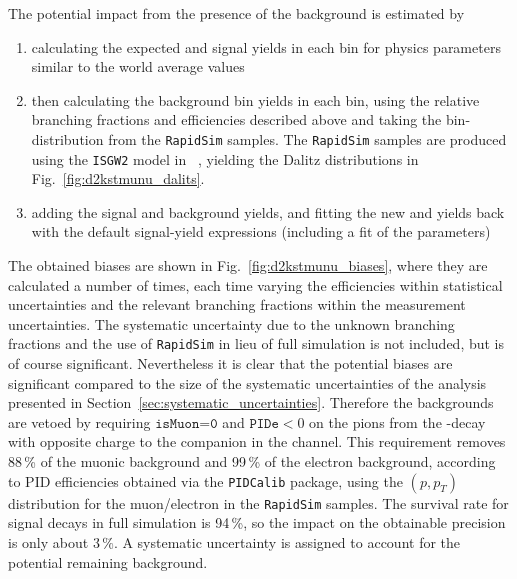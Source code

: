 


The potential impact from the presence of the background is estimated by 
\begin{enumerate}
    \item calculating the expected \BtoDpi and \BtoDK signal yields in each bin for physics parameters similar to the world average values
    \item then calculating the background bin yields in each bin, using the relative branching fractions and efficiencies described above and taking the bin-distribution from the \texttt{RapidSim} samples. The \texttt{RapidSim} samples are produced using the \texttt{ISGW2} model in \evtgen~\cite{EvtGen}, yielding the Dalitz distributions in Fig.~\ref{fig:d2kstmunu_dalits}.
    \item adding the signal and background yields, and fitting the new \BtoDpi and \BtoDK yields back with the default signal-yield expressions (including a fit of the \Fi parameters)
\end{enumerate}
The obtained biases are shown in Fig.~\ref{fig:d2kstmunu_biases}, where they are calculated a number of times, each time varying the efficiencies within statistical uncertainties and the relevant branching fractions within the measurement uncertainties. The  systematic uncertainty due to the unknown branching fractions and the use of \texttt{RapidSim} in lieu of full simulation is not included, but is of course significant. Nevertheless it is clear that the potential biases are significant compared to the size of the systematic uncertainties of the analysis presented in Section~\ref{sec:systematic_uncertainties}. Therefore the backgrounds are vetoed by requiring $\texttt{isMuon=0}$ and $\texttt{PIDe} < 0$ on the pions from the \D-decay with opposite charge to the companion in the \DtoKspipi channel. This requirement removes 88\,\% of the muonic background and 99\,\% of the electron background, according to PID efficiencies obtained via the  \texttt{PIDCalib} package, using the $(p, p_T)$ distribution for the muon/electron in the \texttt{RapidSim} samples. The survival rate for signal decays in full simulation is 94\,\%, so the impact on the obtainable precision is only about $3\,\%$. A systematic uncertainty is assigned to account for the potential remaining background.

